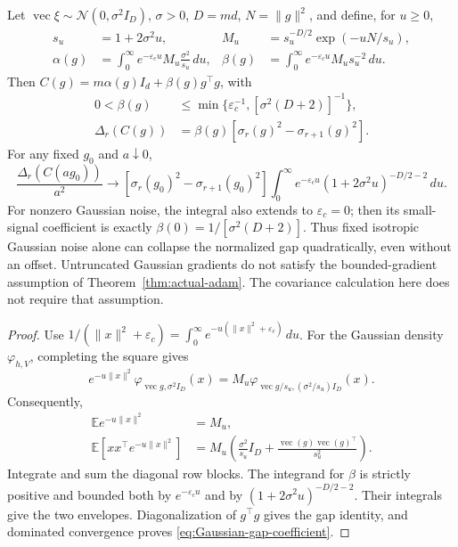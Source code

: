 \begin{proposition}
\label{prop:Gaussian-covariance-integrals}
Let $\operatorname{vec}\xi\sim\mathcal N(0,\sigma^2I_D)$, $\sigma>0$, $D=md$,
$N=\|g\|^2$, and define, for $u\ge0$,
\begin{align}
 s_u&=1+2\sigma^2u,&
 M_u&=s_u^{-D/2}\exp(-uN/s_u),\\
 \alpha(g)&=\int_0^\infty e^{-\varepsilon_cu}M_u
                                      \frac{\sigma^2}{s_u}\,du,&
 \beta(g)&=\int_0^\infty e^{-\varepsilon_cu}M_u s_u^{-2}\,du.
\end{align}
Then $C(g)=m\alpha(g)I_d+\beta(g)g^\top g$, with
\begin{align}
 0<\beta(g)&\le\min\{\varepsilon_c^{-1},[\sigma^2(D+2)]^{-1}\},\\
 \Delta_r(C(g))&=\beta(g)[\sigma_r(g)^2-\sigma_{r+1}(g)^2].
\end{align}
For any fixed $g_0$ and $a\downarrow0$,
\begin{equation}
 \frac{\Delta_r(C(ag_0))}{a^2}\longrightarrow
 [\sigma_r(g_0)^2-\sigma_{r+1}(g_0)^2]
 \int_0^\infty e^{-\varepsilon_cu}(1+2\sigma^2u)^{-D/2-2}\,du.
 \label{eq:Gaussian-gap-coefficient}
\end{equation}
For nonzero Gaussian noise, the integral also extends to $\varepsilon_c=0$;
then its small-signal coefficient is exactly
$\beta(0)=1/[\sigma^2(D+2)]$. Thus fixed isotropic Gaussian noise alone can
collapse the normalized gap quadratically, even without an offset.
Untruncated Gaussian gradients do not satisfy the bounded-gradient
assumption of Theorem~\ref{thm:actual-adam}. The covariance calculation here
does not require that assumption.
\end{proposition}
\begin{proof}
Use $1/(\|x\|^2+\varepsilon_c)=
\int_0^\infty e^{-u(\|x\|^2+\varepsilon_c)}\,du$.
For the Gaussian density $\varphi_{h,V}$, completing the square gives
\begin{equation}
 e^{-u\|x\|^2}\varphi_{\operatorname{vec}g,\sigma^2I_D}(x)
 =M_u\varphi_{\operatorname{vec}g/s_u,(\sigma^2/s_u)I_D}(x).
\end{equation}
Consequently,
\begin{align}
 \mathbb E e^{-u\|x\|^2}&=M_u,\\
 \mathbb E[xx^\top e^{-u\|x\|^2}]
 &=M_u\left(\frac{\sigma^2}{s_u}I_D+
                    \frac{\operatorname{vec}(g)\operatorname{vec}(g)^\top}{s_u^2}\right).
\end{align}
Integrate and sum the diagonal row blocks. The integrand for $\beta$ is
strictly positive and bounded both by $e^{-\varepsilon_cu}$ and by
$(1+2\sigma^2u)^{-D/2-2}$. Their integrals give the two envelopes.
Diagonalization of
$g^\top g$ gives the gap identity, and dominated convergence proves
\eqref{eq:Gaussian-gap-coefficient}.
\end{proof}

